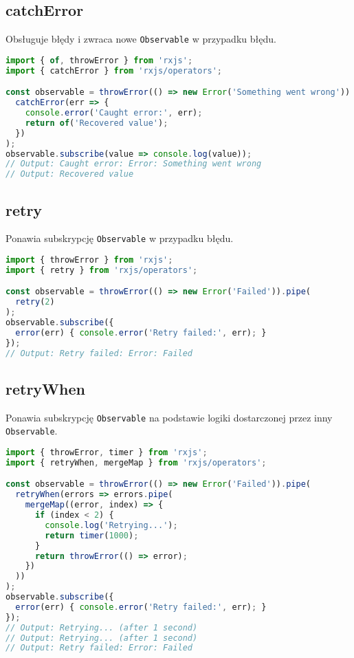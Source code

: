 \documentclass[a4paper,12pt]{article}
\begin{document}
\subsection{catchError}
Obsługuje błędy i zwraca nowe \texttt{Observable} w przypadku błędu.

\begin{lstlisting}[language=JavaScript, caption=Przykład użycia \texttt{catchError}]
import { of, throwError } from 'rxjs';
import { catchError } from 'rxjs/operators';

const observable = throwError(() => new Error('Something went wrong')).pipe(
  catchError(err => {
    console.error('Caught error:', err);
    return of('Recovered value');
  })
);
observable.subscribe(value => console.log(value));
// Output: Caught error: Error: Something went wrong
// Output: Recovered value
\end{lstlisting}

\subsection{retry}
Ponawia subskrypcję \texttt{Observable} w przypadku błędu.

\begin{lstlisting}[language=JavaScript, caption=Przykład użycia \texttt{retry}]
import { throwError } from 'rxjs';
import { retry } from 'rxjs/operators';

const observable = throwError(() => new Error('Failed')).pipe(
  retry(2)
);
observable.subscribe({
  error(err) { console.error('Retry failed:', err); }
});
// Output: Retry failed: Error: Failed
\end{lstlisting}

\subsection{retryWhen}
Ponawia subskrypcję \texttt{Observable} na podstawie logiki dostarczonej przez inny \texttt{Observable}.

\begin{lstlisting}[language=JavaScript, caption=Przykład użycia \texttt{retryWhen}]
import { throwError, timer } from 'rxjs';
import { retryWhen, mergeMap } from 'rxjs/operators';

const observable = throwError(() => new Error('Failed')).pipe(
  retryWhen(errors => errors.pipe(
    mergeMap((error, index) => {
      if (index < 2) {
        console.log('Retrying...');
        return timer(1000);
      }
      return throwError(() => error);
    })
  ))
);
observable.subscribe({
  error(err) { console.error('Retry failed:', err); }
});
// Output: Retrying... (after 1 second)
// Output: Retrying... (after 1 second)
// Output: Retry failed: Error: Failed
\end{lstlisting}
\end{document}
